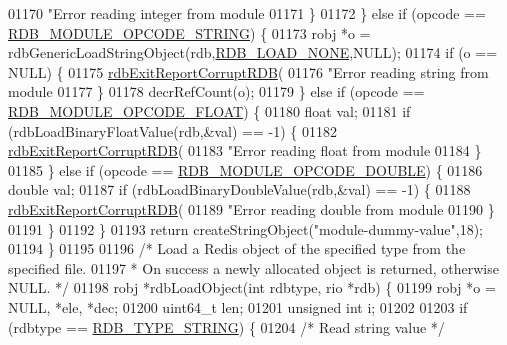 \begin{DoxyCode}
{{{{{{{{{{{{{{{{{{{01170                     \textcolor{stringliteral}{"Error reading integer from module %
01171             \}
01172         \} \textcolor{keywordflow}{else} \textcolor{keywordflow}{if} (opcode == \hyperlink{rdb_8h_aba61dd3092856fb28a71a7e0032d82f1}{RDB\_MODULE\_OPCODE\_STRING}) \{
01173             robj *o = rdbGenericLoadStringObject(rdb,\hyperlink{rdb_8h_aa6539176570d3833856d0b6c71077c67}{RDB\_LOAD\_NONE},NULL);
01174             \textcolor{keywordflow}{if} (o == NULL) \{
01175                 \hyperlink{rdb_8c_afb34e310c0e5dfd9f8c2bebbec59c7f7}{rdbExitReportCorruptRDB}(
01176                     \textcolor{stringliteral}{"Error reading string from module %
01177             \}
01178             decrRefCount(o);
01179         \} \textcolor{keywordflow}{else} \textcolor{keywordflow}{if} (opcode == \hyperlink{rdb_8h_ac6c932476609f11914ab1172688f247e}{RDB\_MODULE\_OPCODE\_FLOAT}) \{
01180             \textcolor{keywordtype}{float} val;
01181             \textcolor{keywordflow}{if} (rdbLoadBinaryFloatValue(rdb,&val) == -1) \{
01182                 \hyperlink{rdb_8c_afb34e310c0e5dfd9f8c2bebbec59c7f7}{rdbExitReportCorruptRDB}(
01183                     \textcolor{stringliteral}{"Error reading float from module %
01184             \}
01185         \} \textcolor{keywordflow}{else} \textcolor{keywordflow}{if} (opcode == \hyperlink{rdb_8h_a657fe8be09e7e9b7b4e071da54d2a5f7}{RDB\_MODULE\_OPCODE\_DOUBLE}) \{
01186             \textcolor{keywordtype}{double} val;
01187             \textcolor{keywordflow}{if} (rdbLoadBinaryDoubleValue(rdb,&val) == -1) \{
01188                 \hyperlink{rdb_8c_afb34e310c0e5dfd9f8c2bebbec59c7f7}{rdbExitReportCorruptRDB}(
01189                     \textcolor{stringliteral}{"Error reading double from module %
01190             \}
01191         \}
01192     \}
01193     \textcolor{keywordflow}{return} createStringObject(\textcolor{stringliteral}{"module-dummy-value"},18);
01194 \}
01195 
01196 \textcolor{comment}{/* Load a Redis object of the specified type from the specified file.}
01197 \textcolor{comment}{ * On success a newly allocated object is returned, otherwise NULL. */}
01198 robj *rdbLoadObject(\textcolor{keywordtype}{int} rdbtype, rio *rdb) \{
01199     robj *o = NULL, *ele, *dec;
01200     uint64\_t len;
01201     \textcolor{keywordtype}{unsigned} \textcolor{keywordtype}{int} i;
01202 
01203     \textcolor{keywordflow}{if} (rdbtype == \hyperlink{rdb_8h_ab64d2f599807d211a63337781c241c41}{RDB\_TYPE\_STRING}) \{
01204         \textcolor{comment}{/* Read string value */}
}}}}}}}}}}}}}}}}}}}}}}}
\end{DoxyCode}
